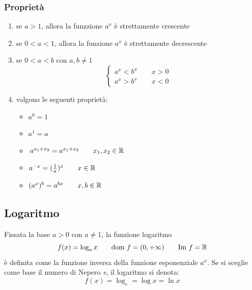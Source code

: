 \subsubsection{Proprietà}
\begin{enumerate}
	\item se $a>1$, allora la funzzione $a^x$ è strettamente crescente
	\item se $0<a<1$, allora la funzione $a^x$ è strettamente decrescente
	\item se $0<a<b$ con $a,b \neq 1$
	\[\begin{cases}
		a^x<b^x \qquad x>0 \\
		a^x > b^x \qquad x<0
	\end{cases}\]
	\item valgono le seguenti proprietà:
	\begin{itemize}
	\item $a^0=1$
	\item $a^1=a$
	\item $a^{x_1+x_2}=a^{x_1+x_2} \qquad x_1,x_2 \in \mathbb{R}$
	\item $a^{-x}=(\frac{1}{a})^x \qquad x \in \mathbb{R}$
	\item $(a^x)^b = a^{bx} \qquad x,b \in \mathbb{R}$
	\end{itemize}
\end{enumerate}

\begin{figure}[bth]
\myfloatalign
{} 
\end{figure}

\subsection{Logaritmo}
Fissata la base $a>0$ con $a\neq 1$, la funzione logaritmo
\[f(x)=\log_a x \qquad \text{dom } f = (0,+\infty) \qquad \text{Im } f = \mathbb{R}\]
è definita come la funzione inversa della funzione esponenziale $a^x$. Se si sceglie come base il numero di Nepero \textit{e}, il logaritmo si denota:
\[f(x)=\log_e = \log x = \ln x\]


